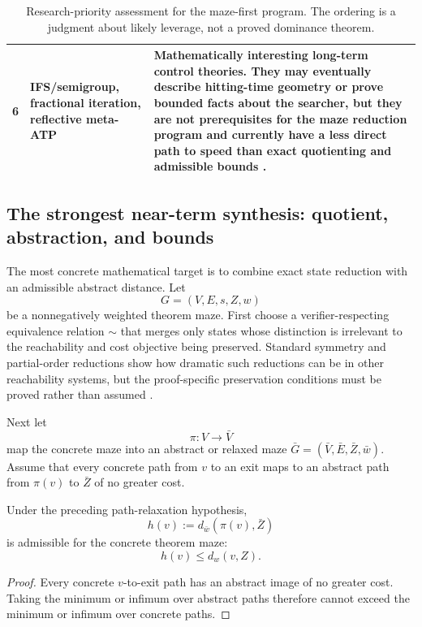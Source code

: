 \begin{table}[ht]
\begin{tabularx}{\textwidth}{p{1.15cm}p{3.4cm}X}
6 & IFS/semigroup, fractional iteration, reflective meta-ATP & Mathematically interesting long-term control theories. They may eventually describe hitting-time geometry or prove bounded facts about the searcher, but they are not prerequisites for the maze reduction program and currently have a less direct path to speed than exact quotienting and admissible bounds \cite{data3,depths}. \\
\bottomrule
\end{tabularx}
\caption{Research-priority assessment for the maze-first program. The ordering is a judgment about likely leverage, not a proved dominance theorem.}
\end{table}

\subsection{The strongest near-term synthesis: quotient, abstraction, and bounds}
The most concrete mathematical target is to combine exact state reduction with an admissible abstract distance. Let
\[
G=(V,E,s,Z,w)
\]
be a nonnegatively weighted theorem maze. First choose a verifier-respecting equivalence relation $\sim$ that merges only states whose distinction is irrelevant to the reachability and cost objective being preserved. Standard symmetry and partial-order reductions show how dramatic such reductions can be in other reachability systems, but the proof-specific preservation conditions must be proved rather than assumed \cite{valmari,peled,symmetry}.

Next let
\[
\pi:V\to\bar V
\]
map the concrete maze into an abstract or relaxed maze $\bar G=(\bar V,\bar E,\bar Z,\bar w)$. Assume that every concrete path from $v$ to an exit maps to an abstract path from $\pi(v)$ to $\bar Z$ of no greater cost.

\begin{proposition}
Under the preceding path-relaxation hypothesis,
\[
h(v):=d_{\bar w}(\pi(v),\bar Z)
\]
is admissible for the concrete theorem maze:
\[
h(v)\le d_w(v,Z).
\]
\end{proposition}
\begin{proof}
Every concrete $v$-to-exit path has an abstract image of no greater cost. Taking the minimum or infimum over abstract paths therefore cannot exceed the minimum or infimum over concrete paths.
\end{proof}


